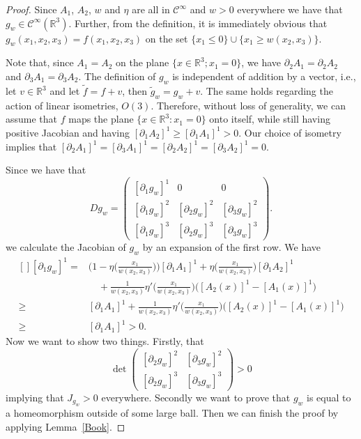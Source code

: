 \documentclass[10pt,a4paper]{amsart}
\def\er{\mathbb R}
\begin{document}
	\begin{proof}
		Since $A_1$, $A_2$, $w$ and $\eta$ are all in $\mathcal{C}^{\infty}$ and $w>0$ everywhere we have that $g_w\in \mathcal{C}^{\infty}(\er^3)$. Further, from the definition, it is immediately obvious that $g_w(x_1,x_2,x_3) = f(x_1,x_2,x_3)$ on the set $\{x_1\leq 0\}\cup \{x_1\geq w(x_2,x_3)\}$.
		
		
		Note that, since $A_1 = A_2$ on the plane $\{x\in \er^3; x_1=0\}$, we have $\partial_2A_1 = \partial_2A_2$ and $\partial_3A_1 = \partial_3A_2$. The definition of $g_w$ is independent of addition by a vector, i.e., let $v\in \er^3$ and let $\tilde{f} = f+v$, then $\tilde{g}_{w} =g_w + v$. The same holds regarding the action of linear isometries, $O(3)$. Therefore, without loss of generality, we can assume that $f$ maps the plane $\{x\in \er^3: x_1=0\}$ onto itself, while still having positive Jacobian and having $[\partial_1 A_2]^1 \geq [\partial_1 A_1]^1>0$. Our choice of isometry implies that $[\partial_2 A_1]^1 = [\partial_3 A_1]^1 = [\partial_2 A_2]^1 = [\partial_3 A_2]^1 = 0$.
		
		
		Since we have that
		\begin{equation}\label{TheMatrix}
			Dg_w = \left( \begin{matrix}
			[\partial_1g_w]^1 &0 &0\\
			[\partial_1g_w]^2 &[\partial_2g_w]^2 & [\partial_3g_w]^2\\
			[\partial_1g_w]^3 &[\partial_2g_w]^3 & [\partial_3g_w]^3
		\end{matrix}\right).
		\end{equation}
		we calculate the Jacobian of $g_w$ by an expansion of the first row. We have
		\begin{equation}\label{D1Posi}
			\begin{aligned}[]
				[\partial_1g_w]^1  =&  \Big(1-\eta\Big(\frac{x_1}{w(x_2,x_3)}\Big)\Big)[\partial_1 A_1]^1+ \eta\Big(\frac{x_1}{w(x_2,x_3)}\Big)[\partial_1 A_2]^1\\
				&  \quad +\frac{1}{w(x_2,x_3)}\eta'\Big(\frac{x_1}{w(x_2,x_3)}\Big)\big([A_2(x)]^1 - [A_1(x)]^1\big) \\
				\geq&  [\partial_1 A_1]^1 + \frac{1}{w(x_2,x_3)}\eta'\Big(\frac{x_1}{w(x_2,x_3)}\Big)\big([A_2(x)]^1 - [A_1(x)]^1\big) \\
				\geq&  [\partial_1 A_1]^1 >0.
			\end{aligned}
		\end{equation}
		Now we want to show two things. Firstly, that 
		$$
		\det \left( \begin{matrix}
			[\partial_2g_w]^2 & [\partial_3g_w]^2\\
			[\partial_2g_w]^3 & [\partial_3g_w]^3
		\end{matrix}\right)>0
		$$
		implying that $J_{g_w}>0$ everywhere. Secondly we want to prove that $g_w$ is equal to a homeomorphism outside of some large ball. Then we can finish the proof by applying Lemma~\ref{Book}. 
		

\end{proof}
\end{document}
